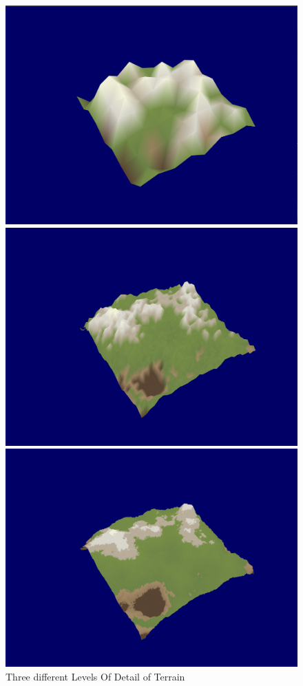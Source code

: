 \documentclass[a4paper,10pt]{report}
\begin{document}
\begin{figure}[h!]
\centering
\begin{minipage}{.3\textwidth}
  \centering
  \includegraphics[width=.9\linewidth]{Images/Sprint-Images/Sprint10-1.png}
    \end{minipage}%
\begin{minipage}{.3\textwidth}
  \centering
  \includegraphics[width=.9\linewidth]{Images/Sprint-Images/Sprint10-2.png}
\end{minipage}
\begin{minipage}{.3\textwidth}
  \centering
  \includegraphics[width=.9\linewidth]{Images/Sprint-Images/Sprint10-3.png}
\end{minipage}
\caption{Three different Levels Of Detail of Terrain}
\label{loddiamondsq}
\end{figure}
\end{document}
